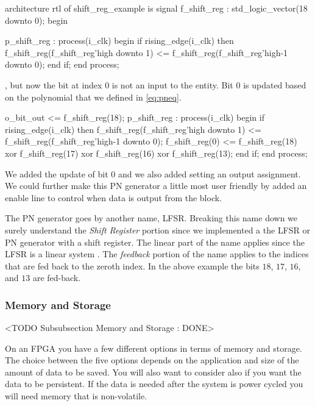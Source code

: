 \begin{VHDLlisting}[tabsize=4]
architecture rtl of shift_reg_example is
    signal f_shift_reg : std_logic_vector(18 downto 0);
begin

p_shift_reg : process(i_clk)
begin
    if rising_edge(i_clk) then
        f_shift_reg(f_shift_reg'high downto 1) <= f_shift_reg(f_shift_reg'high-1 downto 0);
    end if;
end process;
\end{VHDLlisting}

, but now the bit at index $0$ is not an input to the entity. Bit $0$ is updated based on the polynomial that we defined in \ref{eq:pneq}. 	

\begin{VHDLlisting}[tabsize=4]
o_bit_out <= f_shift_reg(18);
p_shift_reg : process(i_clk)
begin
    if rising_edge(i_clk) then
        f_shift_reg(f_shift_reg'high downto 1) <= f_shift_reg(f_shift_reg'high-1 downto 0);
        f_shift_reg(0) <= f_shift_reg(18) xor 
                          f_shift_reg(17) xor 
                          f_shift_reg(16) xor 
                          f_shift_reg(13);
    end if;
end process;
\end{VHDLlisting}

We added the update of bit $0$ and we also added setting an output assignment. We could further make this \ac{PN} generator a little most user friendly by added an enable line to control when data is output from the block.

The \ac{PN} generator goes by another name, \ac{LFSR}. Breaking this name down we surely understand the \emph{Shift Register} portion since we implemented a the \ac{LFSR} or \ac{PN} generator with a shift register. The linear part of the name applies since the \ac{LFSR} is a linear system \cite{??}. The \emph{feedback} portion of the name applies to the indices that are fed back to the zeroth index. In the above example the bits $18$, $17$, $16$, and $13$ are fed-back.

	
\subsubsection{Memory and Storage}
	<TODO Subsubsection  Memory and Storage : DONE>

On an \ac{FPGA} you have a few different options in terms of memory and storage. The choice between the five options depends on the application and size of the amount of data to be saved. You will also want to consider also if you want the data to be persistent. If the data is needed after the system is power cycled you will need memory that is non-volatile. 

